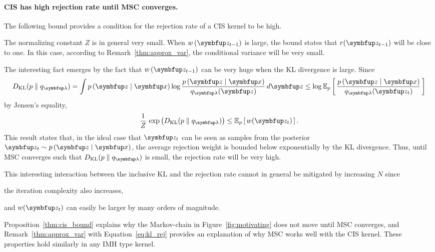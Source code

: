 \paragraph{CIS has high rejection rate until MSC converges.}
The following bound provides a condition for the rejection rate of a CIS kernel to be high.
%

%
The normalizing constant \(Z\) is in general very small.
When \(w\,(\vz_{t-1})\) is large, the bound states that \(r(\vz_{t-1})\) will be close to one.
In this case, according to Remark~\ref{thm:approx_var}, the conditional variance will be very small.

The interesting fact emerges by the fact that \(w\,(\vz_{t-1})\) can be very huge when the KL divergence is large.
Since
\begin{align}
  \DKL{p}{q_{\vlambda}} = \int p\,(\vz\mid\vx) \log \frac{p\,(\vz\mid\vx)}{q_{\vlambda}(\vz)} \, d\vz
  \leq \log \Esub{p}{\frac{p\,(\vz\mid\vx)}{q_{\vlambda}(\vz_t)}}
\end{align}
by Jensen's equality, 
\begin{align}
  \frac{1}{Z}\,\exp\big(\DKL{p}{q_{\vlambda}}\big) \leq \Esub{p}{w(\vz_{t})}.\label{eq:kl_rej}
\end{align}
This result states that, in the ideal case that \(\vz_t\) can be seen as samples from the posterior \(\vz_t \sim p\,(\vz\mid\vx)\), the average rejection weight is bounded below exponentially by the KL divergence.
Thus, until MSC converges such that \(\DKL{p}{q_{\vlambda}}\) is small, the rejection rate will be very high.

This interesting interaction between the inclusive KL and the rejection rate cannot in general be mitigated by increasing \(N\) since
\begin{enumerate*}[label=(\roman*)]
  \item the iteration complexity also increases,
  \item and \(w(\vz_t)\) can easily be larger by many orders of magnitude.
\end{enumerate*}
Proposition~\ref{thm:cis_bound} explains why the Markov-chain in Figure~\ref{fig:motivating} does not move until MSC converges, and Remark~\ref{thm:approx_var} with Equation~\eqref{eq:kl_rej} provides an explanation of why MSC works well with the CIS kernel.
These properties hold similarly in any IMH type kernel.

